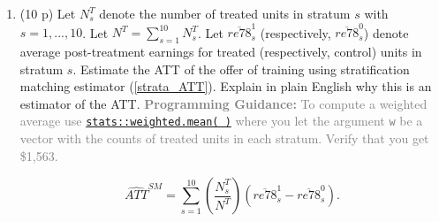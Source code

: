 \documentclass[
]{article}
\begin{document}
\begin{enumerate}
\def\labelenumi{\alph{enumi}.}
\setcounter{enumi}{2}
\item
  (10 p) Let \(N_{s}^{T}\) denote the number of treated units in stratum
  \(s\) with \(s=1,...,10\). Let \(N^{T}=\sum_{s=1}^{10}N_{s}^{T}\). Let
  \(\overline{re78}_{s}^{1}\) (respectively,
  \(\overline{re78}_{s}^{0}\)) denote average post-treatment earnings
  for treated (respectively, control) units in stratum \(s\). Estimate
  the ATT of the offer of training using stratification matching
  estimator (\ref{strata_ATT}). Explain in plain English why this is an
  estimator of the ATT.
  \textcolor{gray}{\textbf{Programming Guidance:} To compute a weighted average use \href{https://www.rdocumentation.org/packages/stats/versions/3.6.2/topics/weighted.mean}{\texttt{stats::weighted.mean( )}} where you let the argument \texttt{w} be a vector with the counts of treated units in each stratum. Verify that you get \$1,563.}\label{item:naive-ATT-estimate}

  \begin{equation}
   \widehat{ATT}^{SM}=\sum_{s=1}^{10}\left( \frac{N_{s}^{T}}{N^{T}}\right) \left( \overline{re78}_{s}^{1}-\overline{re78}_{s}^{0}\right) 
   \text{.}\label{strata_ATT}
   \end{equation}
\end{enumerate}
\end{document}
